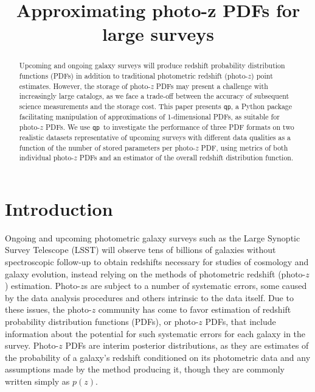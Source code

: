 \documentclass[\docopts]{\docclass}
\newcommand{\qp}{\texttt{qp}}
\newcommand{\pz}{photo-$z$ PDF}
\newcommand{\Pz}{Photo-$z$ PDF}
\begin{document}
\title{ Approximating photo-z PDFs for large surveys }


\begin{abstract}

Upcoming and ongoing galaxy surveys will produce redshift probability 
distribution functions (PDFs) in addition to traditional photometric redshift 
(photo-$z$) point estimates.  However, the storage of \pz s may present a 
challenge with increasingly large catalogs, as we face a trade-off between the 
accuracy of subsequent science measurements and the storage cost.  This paper 
presents \qp, a Python package facilitating manipulation of approximations of 
1-dimensional PDFs, as suitable for \pz s.  We use \qp\ to investigate the 
performance of three PDF formats on two realistic datasets representative of 
upcoming surveys with different data qualities as a function of the number of 
stored parameters per \pz, using metrics of both individual \pz s and an 
estimator of the overall redshift distribution function.

\end{abstract}


\maketitlepost




\section{Introduction}
\label{sec:intro}


Ongoing and upcoming photometric galaxy surveys such as the Large Synoptic 
Survey Telescope (LSST) will observe tens of billions of galaxies without 
spectroscopic follow-up to obtain redshifts necessary for studies of cosmology 
and galaxy evolution, instead relying on the methods of photometric redshift 
(photo-$z$) estimation.  Photo-$z$s are subject to a number of systematic 
errors, some caused by the data analysis procedures and others intrinsic to the 
data itself.  Due to these issues, the photo-$z$ community has come to favor 
estimation of redshift probability distribution functions (PDFs), or \pz s, 
that include information about the potential for such systematic errors for 
each galaxy in the survey.  \Pz s are interim posterior distributions, as they 
are estimates of the probability of a galaxy's redshift conditioned on its 
photometric data and any assumptions made by the method producing it, though 
they are commonly written simply as $p(z)$.
\end{document}
